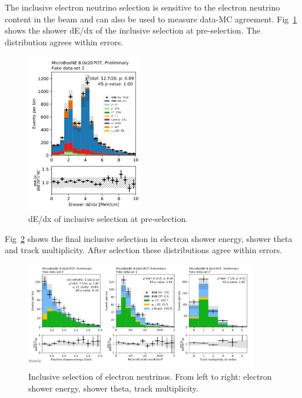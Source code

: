 The inclusive electron neutrino selection is sensitive to the electron neutrino content in the beam and can also be used to measure data-MC agreement.  Fig~\ref{fig:fakedata:set2:inc_presel} shows the shower dE/dx of the inclusive selection at pre-selection.  The distribution agrees within errors.   

\begin{figure}[H]
\begin{center}
\includegraphics[width=0.45\textwidth]{Fakedata/set2/inc_presel.pdf}
\caption{\label{fig:fakedata:set2:inc_presel} dE/dx of inclusive selection at pre-selection.}
\end{center}
\end{figure}

Fig~\ref{fig:fakedata:set2:inc_postsel} shows the final inclusive selection in electron shower energy, shower theta and track multiplicity.  After selection these distributions agree within errors.

\begin{figure}[H]
\begin{center}
\includegraphics[width=0.9\textwidth]{Fakedata/set2/incl_postsel.pdf}
\caption{\label{fig:fakedata:set2:inc_postsel} Inclusive selection of electron neutrinos. From left to right: electron shower energy, shower theta, track multiplicity.}
\end{center}
\end{figure}

